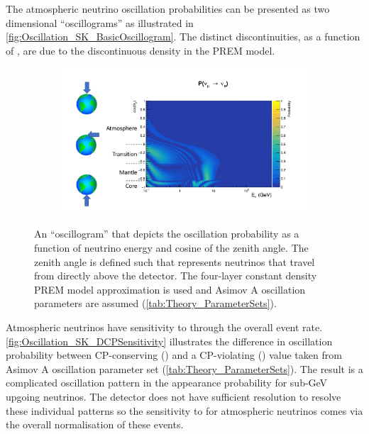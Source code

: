 The atmospheric neutrino oscillation probabilities can be presented as two dimensional ``oscillograms'' as illustrated in \autoref{fig:Oscillation_SK_BasicOscillogram}. The distinct discontinuities, as a function of , are due to the discontinuous density in the PREM model.

\begin{figure}[h]
  \begin{subfigure}[t]{0.8\textwidth}
    \includegraphics[width=\textwidth, trim={0mm 0mm 0mm 0mm}, clip,page=1]{Figures/Oscillation/BasicOscillogramWithNotes.pdf}
  \end{subfigure}
  \caption{An ``oscillogram'' that depicts the  oscillation probability as a function of neutrino energy and cosine of the zenith angle. The zenith angle is defined such that  represents neutrinos that travel from directly above the detector. The four-layer constant density PREM model approximation is used and Asimov A oscillation parameters are assumed (\autoref{tab:Theory_ParameterSets}).}
  \label{fig:Oscillation_SK_BasicOscillogram}
\end{figure}

Atmospheric neutrinos have sensitivity to  through the overall event rate. \autoref{fig:Oscillation_SK_DCPSensitivity} illustrates the difference in oscillation probability between CP-conserving () and a CP-violating () value taken from Asimov A oscillation parameter set (\autoref{tab:Theory_ParameterSets}). The result is a complicated oscillation pattern in the appearance probability for sub-GeV upgoing neutrinos. The detector does not have sufficient resolution to resolve these individual patterns so the sensitivity to  for atmospheric neutrinos comes via the overall normalisation of these events.


